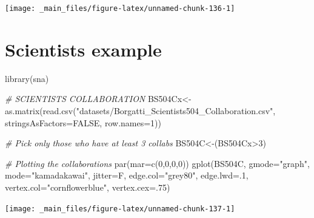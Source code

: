 \documentclass[
  notitlepage,
  onecolumn,
  openany]{book}
\newenvironment{Shaded}{\begin{snugshade}}{\end{snugshade}}
\newcommand{\AttributeTok}[1]{\textcolor[rgb]{0.77,0.63,0.00}{#1}}
\newcommand{\CommentTok}[1]{\textcolor[rgb]{0.56,0.35,0.01}{\textit{#1}}}
\newcommand{\ConstantTok}[1]{\textcolor[rgb]{0.00,0.00,0.00}{#1}}
\newcommand{\DecValTok}[1]{\textcolor[rgb]{0.00,0.00,0.81}{#1}}
\newcommand{\FunctionTok}[1]{\textcolor[rgb]{0.00,0.00,0.00}{#1}}
\newcommand{\NormalTok}[1]{#1}
\newcommand{\OtherTok}[1]{\textcolor[rgb]{0.56,0.35,0.01}{#1}}
\newcommand{\SpecialCharTok}[1]{\textcolor[rgb]{0.00,0.00,0.00}{#1}}
\newcommand{\StringTok}[1]{\textcolor[rgb]{0.31,0.60,0.02}{#1}}
\begin{document}
\begin{center}\texttt{[image: \_main\_files/figure-latex/unnamed-chunk-136-1]} \end{center}

\hypertarget{scientists-example}{%
\section{Scientists example}\label{scientists-example}}

\begin{Shaded}
\begin{Highlighting}[]
\FunctionTok{library}\NormalTok{(sna)}

\CommentTok{\# SCIENTISTS COLLABORATION}
\NormalTok{BS504Cx}\OtherTok{\textless{}{-}}\FunctionTok{as.matrix}\NormalTok{(}\FunctionTok{read.csv}\NormalTok{(}\StringTok{"datasets/Borgatti\_Scientists504\_Collaboration.csv"}\NormalTok{,}
                            \AttributeTok{stringsAsFactors=}\ConstantTok{FALSE}\NormalTok{, }\AttributeTok{row.names=}\DecValTok{1}\NormalTok{))}

\CommentTok{\# Pick only those who have at least 3 collabs}
\NormalTok{BS504C}\OtherTok{\textless{}{-}}\NormalTok{(BS504Cx}\SpecialCharTok{\textgreater{}}\DecValTok{3}\NormalTok{)}

\CommentTok{\# Plotting the collaborations}
\FunctionTok{par}\NormalTok{(}\AttributeTok{mar=}\FunctionTok{c}\NormalTok{(}\DecValTok{0}\NormalTok{,}\DecValTok{0}\NormalTok{,}\DecValTok{0}\NormalTok{,}\DecValTok{0}\NormalTok{))}
\FunctionTok{gplot}\NormalTok{(BS504C, }
      \AttributeTok{gmode=}\StringTok{"graph"}\NormalTok{,}
      \AttributeTok{mode=}\StringTok{"kamadakawai"}\NormalTok{,}
      \AttributeTok{jitter=}\NormalTok{F,}
      \AttributeTok{edge.col=}\StringTok{"grey80"}\NormalTok{, }
      \AttributeTok{edge.lwd=}\NormalTok{.}\DecValTok{1}\NormalTok{,}
      \AttributeTok{vertex.col=}\StringTok{"cornflowerblue"}\NormalTok{,}
      \AttributeTok{vertex.cex=}\NormalTok{.}\DecValTok{75}\NormalTok{)}
\end{Highlighting}
\end{Shaded}

\begin{center}\texttt{[image: \_main\_files/figure-latex/unnamed-chunk-137-1]} \end{center}
\end{document}
